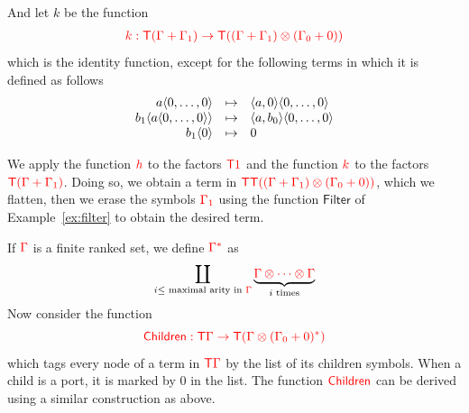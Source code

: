 \begin{example}
\begin{enumerate}
And let $k$ be the function
\begin{align*}
{\color{red}{k: {\color{red}{\mathsf T}}(\Gamma+\Gamma_1) \to {\color{red}{\mathsf T}}((\Gamma+\Gamma_1)\otimes(\Gamma_0+0))}}
\end{align*}
which is the identity function, except for the following terms in which it is defined as follows
$$\begin{array}{rll}
a\langle{0,\dots, 0}\rangle& \mapsto & \langle{a,0}\rangle\langle{0,\dots,0}\rangle\\
b_1\langle{a\langle{0,\dots,0}\rangle}\rangle&\mapsto& \langle{a,b_0}\rangle\langle{0,\dots,0}\rangle\\
b_1\langle{0}\rangle &\mapsto& 0
\end{array}$$
\end{enumerate}
We apply the function ${\color{red}{h}}$ to the factors ${\color{red}{{\color{red}{\mathsf T}}1}}$ and the function ${\color{red}{k}}$ to the factors ${\color{red}{{\color{red}{\mathsf T}}({\color{red}{\Gamma}}+{\color{red}{\Gamma}}_1)}}$. Doing so, we obtain a term in ${\color{red}{{\color{red}{\mathsf T}}{\color{red}{\mathsf T}}((\Gamma+\Gamma_1)\otimes(\Gamma_0+0))}}$, which we flatten, then we erase the symbols ${\color{red}{\Gamma_1}}$ using the function $\mathsf{Filter}$ of Example~\ref{ex:filter} to obtain the desired term. 
	

\smallskip
If ${\color{red}{\Gamma}}$ is a finite ranked set, we define ${\color{red}{\Gamma^*}}$ as
$$\coprod_{i \leq \text{ maximal arity in } {\color{red}{\Gamma}}} \underbrace{{\color{red}{{\color{red}{\Gamma}}\otimes \cdots \otimes {\color{red}{\Gamma}}}}}_{i\text{ times}}$$
Now consider the function $${\color{red}{\mathsf{Children}:{\color{red}{\mathsf T}}{\color{red}{\Gamma}}\to {\color{red}{\mathsf T}}({\color{red}{\Gamma}}\otimes ({\color{red}{\Gamma}}_0+0)^*)}}$$ which tags every node of a term in ${\color{red}{\mathsf T}} {\color{red}{\Gamma}}$ by the list  of its children symbols. When a child is a port, it is marked by $0$ in the list.
The function ${\color{red}{\mathsf{Children}}}$ can be derived using a similar construction as above.
\end{example}



